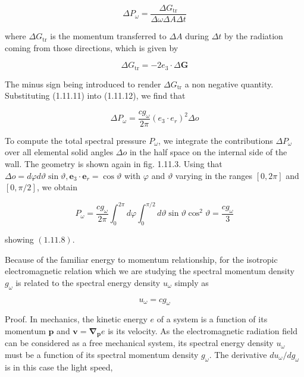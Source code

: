 \documentclass{article}
\begin{document}
\begin{equation*}
\Delta P_{\omega}=\frac{\Delta G_{\mathrm{tr}}}{\Delta \omega \Delta A \Delta t} \tag{1.11.12}
\end{equation*}
 
where $\Delta G_{\mathrm{tr}}$ is the momentum transferred to $\Delta A$ during $\Delta t$ by the radiation coming from those directions, which is given by
 
\begin{equation*}
\Delta G_{\mathrm{tr}}=-2 e_{3} \cdot \Delta \boldsymbol{G} \tag{1.11.13}
\end{equation*}
 

The minus sign being introduced to render $\Delta G_{\mathrm{tr}}$ a non negative quantity. Substituting
(1.11.11) into (1.11.12), we find that
 
\begin{equation*}
\Delta P_{\omega}=\frac{c g_{\omega}}{2 \pi}\left(e_{3} \cdot e_{r}\right)^{2} \Delta o \tag{1.11.14}
\end{equation*}
 

To compute the total spectral pressure $P_{\omega}$, we integrate the contributions $\Delta P_{\omega}$ over all elemental solid angles $\Delta o$ in the half space on the internal side of the wall. The geometry is shown again in fig. 1.11.3. Using that $\Delta o=d \varphi d \vartheta \sin \vartheta, \boldsymbol{e}_{3} \cdot \boldsymbol{e}_{r}=\cos \vartheta$ with $\varphi$ and $\vartheta$ varying in the ranges $[0,2 \pi]$ and $[0, \pi / 2]$, we obtain
 
\begin{equation*}
P_{\omega}=\frac{c g_{\omega}}{2 \pi} \int_{0}^{2 \pi} d \varphi \int_{0}^{\pi / 2} d \vartheta \sin \vartheta \cos ^{2} \vartheta=\frac{c g_{\omega}}{3} \tag{1.11.15}
\end{equation*}
 
showing $(1.11 .8)$.

Because of the familiar energy to momentum relationship, for the isotropic electromagnetic relation which we are studying the spectral momentum density $g_{\omega}$ is related to the spectral energy density $u_{\omega}$ simply as
 
\begin{equation*}
u_{\omega}=c g_{\omega} \tag{1.11.16}
\end{equation*}
 

Proof. In mechanics, the kinetic energy $e$ of a system is a function of its momentum $\boldsymbol{p}$ and $\boldsymbol{v}=\boldsymbol{\nabla}_{\boldsymbol{p}} e$ is its velocity. As the electromagnetic radiation field can be considered as a free mechanical system, its spectral energy density $u_{\omega}$ must be a function of its spectral momentum density $g_{\omega}$. The derivative $d u_{\omega} / d g_{\omega}$ is in this case the light speed,
 
\end{document}
